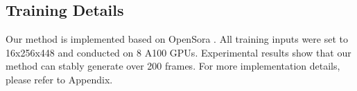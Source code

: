 \begin{table}[tb]
    \centering
    \footnotesize
        \centering
        \caption{Comparing with SoTA methods on the validation set of the nuScenes dataset. We generate the entire validation set without applying any post-processing strategies to select specific samples.}
        \label{tab:fvd}
\end{table}


\subsection{Training Details}
Our method is implemented based on OpenSora \cite{opensora}. 
All training inputs were set to 16x256x448 and conducted on 8 A100 GPUs.
Experimental results show that our method can stably generate over 200 frames. For more implementation details, please refer to Appendix.%





